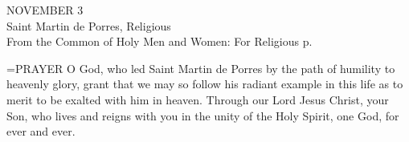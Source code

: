\begin{center}\normalsize NOVEMBER 3\\
\footnotesize Saint Martin de Porres, Religious\\
\footnotesize From the Common of Holy Men and Women: For Religious p.\\
\end{center}

\hangindent=\parindent \small{PRAYER 
O God, who led Saint Martin de Porres
by the path of humility to heavenly glory,
grant that we may so follow his radiant example in this life
as to merit to be exalted with him in heaven.
Through our Lord Jesus Christ, your Son,
who lives and reigns with you in the unity of the Holy Spirit,
one God, for ever and ever.\\}
 

